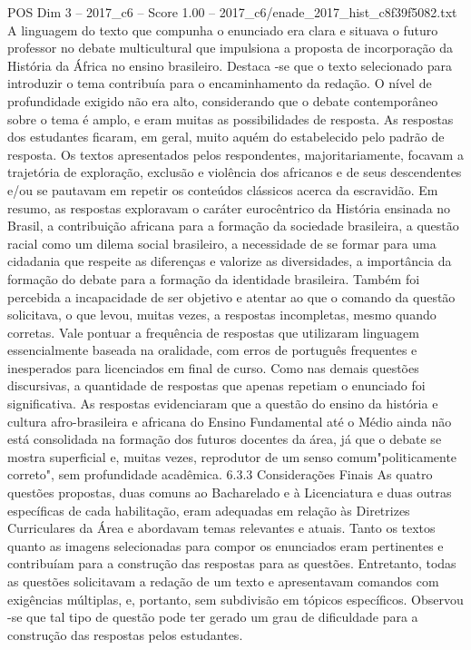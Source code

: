 \begin{textsample}{POS Dim 3 – 2017\_c6 – Score 1.00 – 2017\_c6/enade\_2017\_hist\_c8f39f5082.txt}
A linguagem do texto que compunha o enunciado era clara e situava o futuro professor no debate multicultural que impulsiona a proposta de incorporação da História da África no ensino brasileiro.
Destaca -se que o texto selecionado para introduzir o tema contribuía para o encaminhamento da redação.
O nível de profundidade exigido não era alto, considerando que o debate contemporâneo sobre o tema é amplo, e eram muitas as possibilidades de resposta.
As respostas dos estudantes ficaram, em geral, muito aquém do estabelecido pelo padrão de resposta.
Os textos apresentados pelos respondentes, majoritariamente, focavam a trajetória de exploração, exclusão e violência dos africanos e de seus descendentes e/ou se pautavam em repetir os conteúdos clássicos acerca da escravidão.
Em resumo, as respostas exploravam o caráter eurocêntrico da História ensinada no Brasil, a contribuição africana para a formação da sociedade brasileira, a questão racial como um dilema social brasileiro, a necessidade de se formar para uma cidadania que respeite as diferenças e valorize as diversidades, a importância da formação do debate para a formação da identidade brasileira.
Também foi percebida a incapacidade de ser objetivo e atentar ao que o comando da questão solicitava, o que levou, muitas vezes, a respostas incompletas, mesmo quando corretas.
Vale pontuar a frequência de respostas que utilizaram linguagem essencialmente baseada na oralidade, com erros de português frequentes e inesperados para licenciados em final de curso.
Como nas demais questões discursivas, a quantidade de respostas que apenas repetiam o enunciado foi significativa.
As respostas evidenciaram que a questão do ensino da história e cultura afro-brasileira e africana do Ensino Fundamental até o Médio ainda não está consolidada na formação dos futuros docentes da área, já que o debate se mostra superficial e, muitas vezes, reprodutor de um senso comum"politicamente correto", sem profundidade acadêmica. 6.3.3 Considerações Finais As quatro questões propostas, duas comuns ao Bacharelado e à Licenciatura e duas outras específicas de cada habilitação, eram adequadas em relação às Diretrizes Curriculares da Área e abordavam temas relevantes e atuais.
Tanto os textos quanto as imagens selecionadas para compor os enunciados eram pertinentes e contribuíam para a construção das respostas para as questões.
Entretanto, todas as questões solicitavam a redação de um texto e apresentavam comandos com exigências múltiplas, e, portanto, sem subdivisão em tópicos específicos.
Observou -se que tal tipo de questão pode ter gerado um grau de dificuldade para a construção das respostas pelos estudantes.

\end{textsample}

